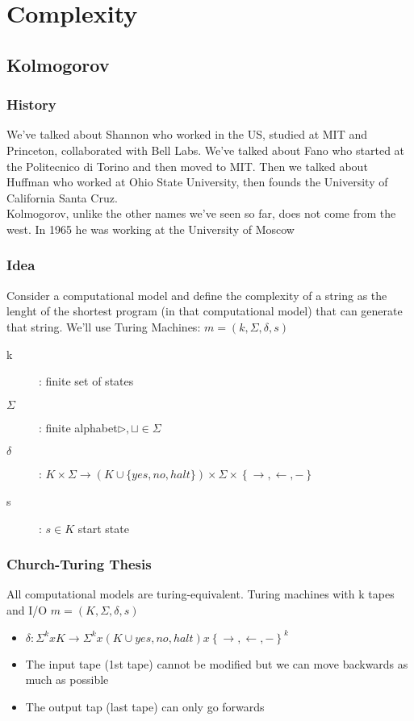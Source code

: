 \section{Complexity}
    \subsection{Kolmogorov}
        \subsubsection{History}
        We've talked about Shannon who worked in the US, studied at MIT and Princeton, collaborated with Bell Labs.
        We've talked about Fano who started at the Politecnico di Torino and then moved to MIT.
        Then we talked about Huffman who worked at Ohio State University, then founds the University of California Santa Cruz.\\
        Kolmogorov, unlike the other names we've seen so far, does not come from the west. In 1965 he was working at the University of Moscow\\
        \subsubsection{Idea}
        Consider a computational model and define the complexity of a string as the lenght of the shortest program (in that computational model)
        that can generate that string. We'll use Turing Machines: $m = (k, \Sigma,\delta, s)$
        \begin{description}
            \item[k]: finite set of states
            \item[$\Sigma$]: finite alphabet\quad  $\triangleright, \sqcup \in \Sigma$
            \item[$\delta$]: $K \times \Sigma \longrightarrow (K\cup\{yes, no, halt\}) \times  \Sigma \times \left\{\rightarrow, \leftarrow, -\right\}$
            \item[s]: $s \in K$ start state
        \end{description}
    \subsubsection{Church-Turing Thesis}
    All computational models are turing-equivalent.\newline
    Turing machines with k tapes and I/O
    $m=(K,\Sigma, \delta, s)$
    \begin{itemize}
        \item $\delta: \Sigma^k x K \rightarrow \Sigma^k x (K \cup {yes, no, halt}) x \left\{ \rightarrow, \leftarrow, - \right\}^k$
        \item The input tape (1st tape) cannot be modified but we can move backwards as much as possible
        \item The output tap (last tape) can only go forwards
    \end{itemize}
